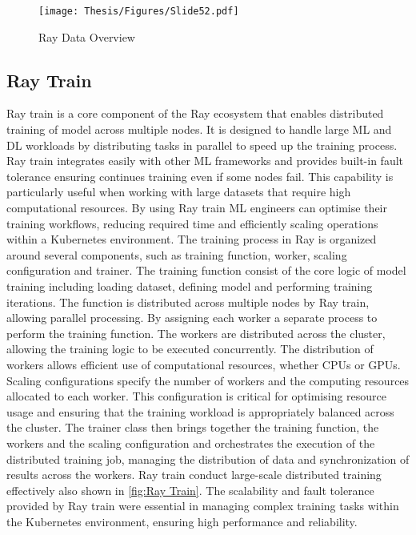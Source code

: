 \clearpage

\begin{figure}[h]
\centering
\texttt{[image: Thesis/Figures/Slide52.pdf]}
\caption{\label{fig:Ray Data}Ray Data Overview \cite{anyscale_blog}}
\end{figure}



\subsection{Ray Train}

Ray train is a core component of the Ray ecosystem that enables distributed training of model across multiple nodes. It is designed to handle large ML and DL workloads by distributing tasks in parallel to speed up the training process. Ray train integrates easily with other ML frameworks and provides built-in fault tolerance ensuring continues training even if some nodes fail. This capability is particularly useful when working with large datasets that require high computational resources. By using Ray train ML engineers can optimise their training workflows, reducing required time and efficiently scaling operations within a Kubernetes environment. The training process in Ray is organized around several components, such as training function, worker, scaling configuration and trainer. The training function consist of the core logic of model training including loading dataset, defining model and performing training iterations. The function is distributed across multiple nodes by Ray train, allowing parallel processing. By assigning each worker a separate process to perform the training function. The workers are distributed across the cluster, allowing the training logic to be executed concurrently. The distribution of workers allows efficient use of computational resources, whether CPUs or GPUs. Scaling configurations specify the number of workers and the computing resources allocated to each worker. This configuration is critical for optimising resource usage and ensuring that the training workload is appropriately balanced across the cluster. The trainer class then brings together the training function, the workers and the scaling configuration and orchestrates the execution of the distributed training job, managing the distribution of data and synchronization of results across the workers. Ray train conduct large-scale distributed training effectively also shown in \autoref{fig:Ray Train}. The scalability and fault tolerance provided by Ray train were essential in managing complex training tasks within the Kubernetes environment, ensuring high performance and reliability. \cite{ray_doc}


